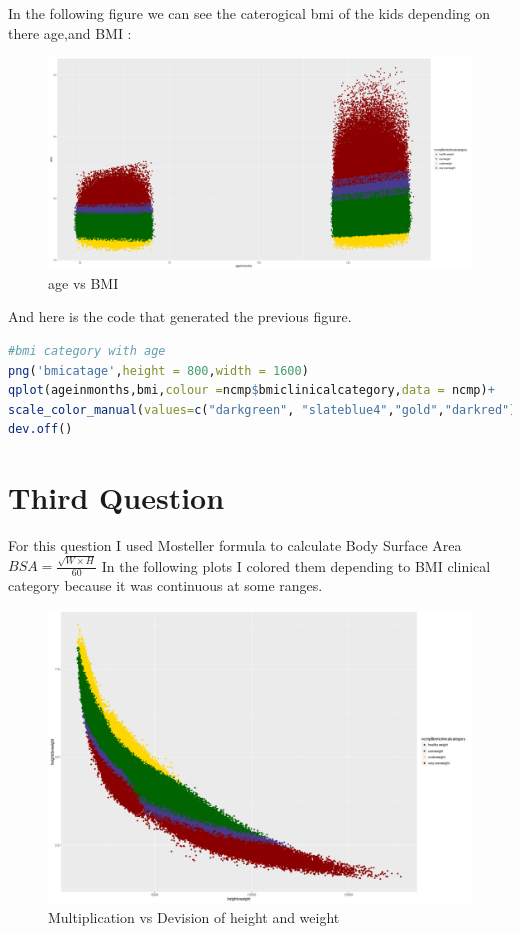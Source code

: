 \documentclass{article}
\begin{document}
In the following figure we can see the caterogical bmi of the kids depending on there age,and BMI : 
\begin{figure}[H]
	\begin{center}
		\includegraphics[scale=0.3]{bmicatage.PNG}
	\end{center}
	\caption{age vs BMI}
\end{figure}
And here is the code that generated the previous figure.
\begin{lstlisting}[language=R]
#bmi category with age
png('bmicatage',height = 800,width = 1600)
qplot(ageinmonths,bmi,colour =ncmp$bmiclinicalcategory,data = ncmp)+
scale_color_manual(values=c("darkgreen", "slateblue4","gold","darkred"))
dev.off()
\end{lstlisting}
	\section*{Third Question}
	For this question I used Mosteller formula to calculate Body Surface Area \(BSA =\frac{\sqrt{W\times H}}{60}\)
	In the following plots I colored them depending to BMI clinical category because it was continuous at some ranges. 
	\begin{figure}[H]
		\begin{center}
			\includegraphics[scale=0.4]{xdiv.png}
		\end{center}
		\caption{Multiplication vs Devision of height and weight }
	\end{figure}
	
\end{document}
